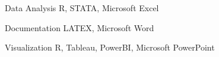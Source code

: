 

\begin{cvskills}
\cvskill
{Data Analysis} %
{R, STATA, Microsoft Excel} %


\cvskill
{Documentation} %
{LATEX, Microsoft Word} %

\cvskill
{Visualization} %
{R, Tableau, PowerBI, Microsoft PowerPoint} %
\end{cvskills}
\relax